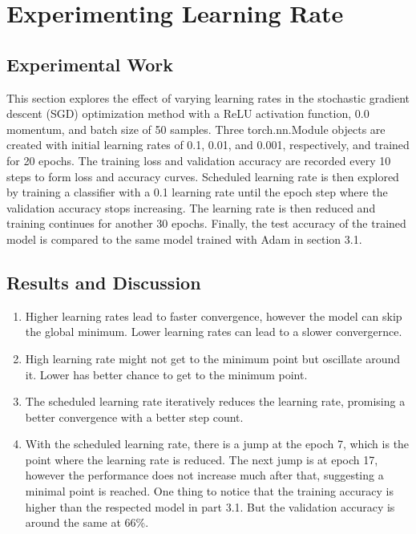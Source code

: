\documentclass[3p,times,procedia]{elsarticle}
\begin{document}
\section{\textbf{Experimenting Learning Rate}}

\subsection{\textbf{Experimental Work}}
This section explores the effect of varying learning rates in the stochastic gradient descent (SGD) optimization method with a ReLU activation function, 0.0 momentum, and batch size of 50 samples. Three torch.nn.Module objects are created with initial learning rates of 0.1, 0.01, and 0.001, respectively, and trained for 20 epochs. The training loss and validation accuracy are recorded every 10 steps to form loss and accuracy curves.
Scheduled learning rate is then explored by training a classifier with a 0.1 learning rate until the epoch step where the validation accuracy stops increasing. The learning rate is then reduced and training continues for another 30 epochs. Finally, the test accuracy of the trained model is compared to the same model trained with Adam in section 3.1.


\subsection{\textbf{Results and Discussion}}
\begin{enumerate}
    \item Higher learning rates lead to faster convergence, however the model can skip the global minimum. Lower learning rates can lead to a slower convergernce.
    \item High learning rate might not get to the minimum point but oscillate around it. Lower has better chance to get to the minimum point.
    \item The scheduled learning rate iteratively reduces the learning rate, promising a better convergence with a better step count.
    \item With the scheduled learning rate, there is a jump at the epoch 7, which is the point where the learning rate is reduced.
    The next jump is at epoch 17, however the performance does not increase much after that, suggesting a minimal point is reached.
    One thing to notice that the training accuracy is higher than the respected model in part 3.1.
    But the validation accuracy is around the same at 66\%.

\end{enumerate}
\end{document}
